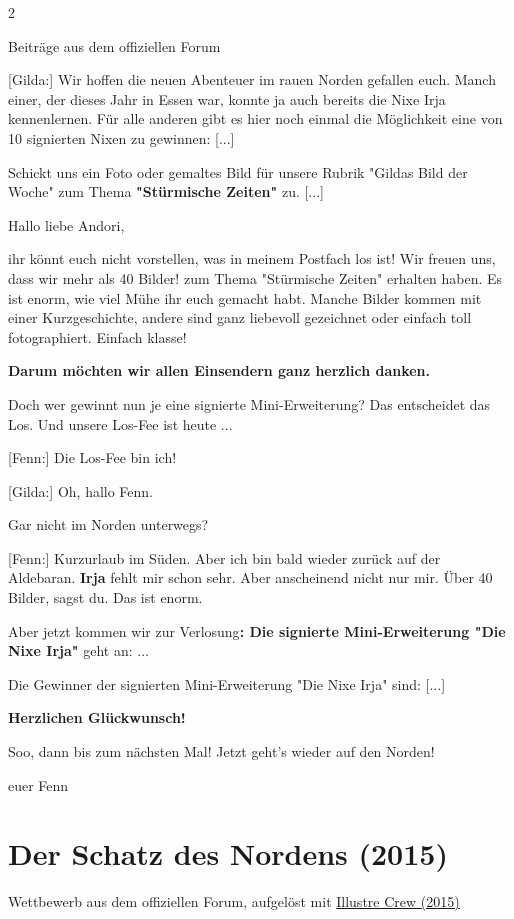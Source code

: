 \documentclass[10pt, a4paper, oneside]{book}
\newcommand{\produkt}[2][]{%
        \section{#2}%
        \label{produkt-#1}%
    }
\newcommand{\fillbreak}{\vspace*{\fill}\columnbreak}
\begin{document}
\begin{multicols}{2}
\begin{center}
    Beiträge aus dem offiziellen Forum
\end{center}

[Gilda:] Wir hoffen die neuen Abenteuer im rauen Norden gefallen euch. Manch einer, der dieses Jahr in Essen war, konnte ja auch bereits die Nixe Irja kennenlernen. Für alle anderen gibt es hier noch einmal die Möglichkeit eine von 10 signierten Nixen zu gewinnen: [...]

Schickt uns ein Foto oder gemaltes Bild für unsere Rubrik "Gildas Bild der Woche" zum Thema \textbf{"Stürmische Zeiten"} zu. [...]

Hallo liebe Andori,

ihr könnt euch nicht vorstellen, was in meinem Postfach los ist!
Wir freuen uns, dass wir mehr als 40 Bilder! zum Thema "Stürmische Zeiten" erhalten haben. Es ist enorm, wie viel Mühe ihr euch gemacht habt. Manche Bilder kommen mit einer Kurzgeschichte, andere sind ganz liebevoll gezeichnet oder einfach toll fotographiert. Einfach klasse!

\textbf{Darum möchten wir allen Einsendern ganz herzlich danken.}

Doch wer gewinnt nun je eine signierte Mini-Erweiterung?
Das entscheidet das Los. Und unsere Los-Fee ist heute ...

[Fenn:] Die Los-Fee bin ich!

[Gilda:] Oh, hallo Fenn.

Gar nicht im Norden unterwegs?

[Fenn:] Kurzurlaub im Süden. Aber ich bin bald wieder zurück auf der Aldebaran. \textbf{Irja} fehlt mir schon sehr. Aber anscheinend nicht nur mir. Über 40 Bilder, sagst du. Das ist enorm.

Aber jetzt kommen wir zur Verlosung\textbf{: Die signierte Mini-Erweiterung "Die Nixe Irja"} geht an: ...

Die Gewinner der signierten Mini-Erweiterung "Die Nixe Irja" sind: [...]

\textbf{Herzlichen Glückwunsch!}

Soo, dann bis zum nächsten Mal! Jetzt geht's wieder auf den Norden!

euer Fenn


\fillbreak
\produkt[2015-der-schatz-des-nordens]{Der Schatz des Nordens (2015)}

\begin{center}
    Wettbewerb aus dem offiziellen Forum, aufgelöst mit \hyperref[storytext-2015-illustre-crew]{Illustre Crew (2015)}
\end{center}


\end{multicols}
\end{document}
